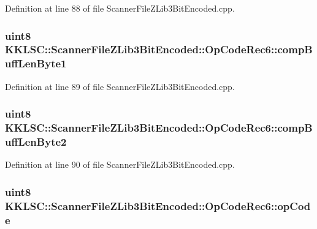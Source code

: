 Definition at line 88 of file Scanner\+File\+Z\+Lib3\+Bit\+Encoded.\+cpp.

\subsubsection[{\texorpdfstring{comp\+Buff\+Len\+Byte1}{compBuffLenByte1}}]{\setlength{\rightskip}{0pt plus 5cm}uint8 K\+K\+L\+S\+C\+::\+Scanner\+File\+Z\+Lib3\+Bit\+Encoded\+::\+Op\+Code\+Rec6\+::comp\+Buff\+Len\+Byte1}\hypertarget{struct_scanner_file_z_lib3_bit_encoded_1_1_op_code_rec6_a27364e9c74664136b2786946e5b6c88d}{}\label{struct_scanner_file_z_lib3_bit_encoded_1_1_op_code_rec6_a27364e9c74664136b2786946e5b6c88d}


Definition at line 89 of file Scanner\+File\+Z\+Lib3\+Bit\+Encoded.\+cpp.

\subsubsection[{\texorpdfstring{comp\+Buff\+Len\+Byte2}{compBuffLenByte2}}]{\setlength{\rightskip}{0pt plus 5cm}uint8 K\+K\+L\+S\+C\+::\+Scanner\+File\+Z\+Lib3\+Bit\+Encoded\+::\+Op\+Code\+Rec6\+::comp\+Buff\+Len\+Byte2}\hypertarget{struct_scanner_file_z_lib3_bit_encoded_1_1_op_code_rec6_a8c6b43ae78f94c9c3399dffbb0e34ccb}{}\label{struct_scanner_file_z_lib3_bit_encoded_1_1_op_code_rec6_a8c6b43ae78f94c9c3399dffbb0e34ccb}


Definition at line 90 of file Scanner\+File\+Z\+Lib3\+Bit\+Encoded.\+cpp.

\subsubsection[{\texorpdfstring{op\+Code}{opCode}}]{\setlength{\rightskip}{0pt plus 5cm}uint8 K\+K\+L\+S\+C\+::\+Scanner\+File\+Z\+Lib3\+Bit\+Encoded\+::\+Op\+Code\+Rec6\+::op\+Code}\hypertarget{struct_scanner_file_z_lib3_bit_encoded_1_1_op_code_rec6_aacd07a55958431eb636e8fd271259e44}{}\label{struct_scanner_file_z_lib3_bit_encoded_1_1_op_code_rec6_aacd07a55958431eb636e8fd271259e44}



